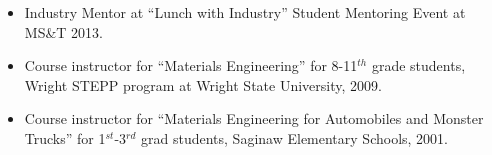 \begin{itemize}
\item Industry Mentor at ``Lunch with Industry'' Student Mentoring Event at MS\&T 2013.
\item Course instructor for ``Materials Engineering'' for 8-11$^{th}$ grade students, Wright STEPP program at Wright State University, 2009. 
\item Course instructor for ``Materials Engineering for Automobiles and Monster Trucks'' for 1$^{st}$-3$^{rd}$ grad students, Saginaw Elementary Schools, 2001.
\end{itemize}

